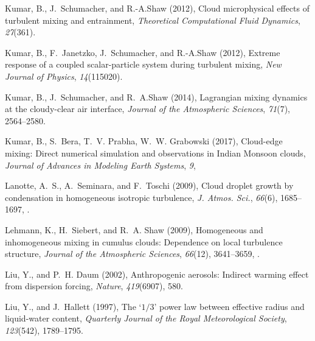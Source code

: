 \documentclass[draft,linenumbers]{agujournal}
\begin{document}
\begin{thebibliography}{60}
Kumar, B., J.~Schumacher, and R.-A.Shaw (2012{}), Cloud
  microphysical effects of turbulent mixing and entrainment,
  \textit{Theoretical Computational Fluid Dynamics}, \textit{27}(361).

Kumar, B., F.~Janetzko, J.~Schumacher, and R.-A.Shaw (2012{}),
  Extreme response of a coupled scalar-particle system during turbulent mixing,
  \textit{New Journal of Physics}, \textit{14}(115020).

Kumar, B., J.~Schumacher, and R.~A.Shaw (2014), Lagrangian mixing dynamics at
  the cloudy-clear air interface, \textit{Journal of the Atmospheric Sciences},
  \textit{71}(7), 2564--2580.

Kumar, B., S.~Bera, T.~V. Prabha, W.~W. Grabowski (2017), Cloud-edge mixing: Direct numerical simulation and observations in Indian Monsoon clouds, \textit{Journal of Advances in Modeling Earth Systems}, \textit{9}, 
  
Lanotte, A.~S., A.~Seminara, and F.~Toschi (2009), Cloud droplet growth by
  condensation in homogeneous isotropic turbulence, \textit{J. Atmos. Sci.},
  \textit{66}(6), 1685--1697, .

Lehmann, K., H.~Siebert, and R.~A. Shaw (2009), Homogeneous and
  inhomogeneous mixing in cumulus clouds: Dependence on local turbulence
  structure, \textit{Journal of the Atmospheric Sciences}, \textit{66}(12),
  3641--3659, .

Liu, Y., and P.~H. Daum (2002), Anthropogenic aerosols: Indirect warming effect
  from dispersion forcing, \textit{Nature}, \textit{419}(6907), 580.

Liu, Y., and J.~Hallett (1997), The `$1/3$' power law between effective radius
  and liquid-water content, \textit{Quarterly Journal of the Royal
  Meteorological Society}, \textit{123}(542), 1789--1795.


\end{thebibliography}
\end{document}
